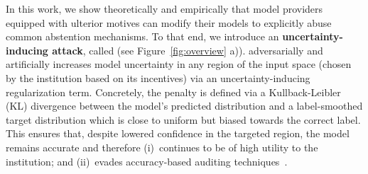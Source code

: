 
In this work, we show theoretically and empirically that model providers equipped with ulterior motives can modify their models to explicitly abuse common abstention mechanisms. To that end, we introduce an \textbf{uncertainty-inducing attack}, called \attack (see Figure~\ref{fig:overview} a)). \attack adversarially and artificially increases model uncertainty in any region of the input space (chosen by the institution based on its incentives) via an uncertainty-inducing regularization term. Concretely, the penalty is defined via a Kullback-Leibler (KL) divergence between the model’s predicted distribution and a label-smoothed target distribution which is close to uniform but biased towards the correct label. This ensures that, despite lowered confidence in the targeted region, the model remains accurate and therefore (i)~continues to be of high utility to the institution; and (ii)~evades accuracy-based auditing techniques~\citep{hardt2016equality}.%

